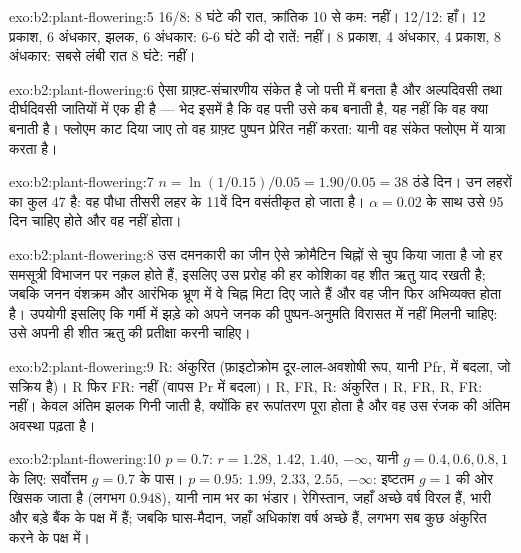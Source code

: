 \begin{solution}{exo:b2:plant-flowering:5}
16/8: 8 घंटे की रात, क्रांतिक 10 से कम: नहीं। 12/12: हाँ।
12 प्रकाश, 6 अंधकार, झलक, 6 अंधकार: 6-6 घंटे की दो रातें: नहीं।
8 प्रकाश, 4 अंधकार, 4 प्रकाश, 8 अंधकार: सबसे लंबी रात 8 घंटे: नहीं।
\end{solution}

\begin{solution}{exo:b2:plant-flowering:6}
 ऐसा ग्राफ़्ट-संचारणीय संकेत है जो पत्ती में बनता है और
अल्पदिवसी तथा दीर्घदिवसी जातियों में एक ही है --- भेद इसमें है कि
वह पत्ती उसे कब बनाती है, यह नहीं कि वह क्या बनाती है। फ्लोएम काट दिया
जाए तो वह ग्राफ़्ट पुष्पन प्रेरित नहीं करता: यानी वह संकेत
फ्लोएम में यात्रा करता है।
\end{solution}

\begin{solution}{exo:b2:plant-flowering:7}
$n = \ln(1/0.15)/0.05 = 1.90/0.05 = 38$ ठंडे दिन। उन लहरों का कुल
$47$ है: वह पौधा तीसरी लहर के 11वें दिन वसंतीकृत हो जाता है।
$\alpha = 0.02$ के साथ उसे 95 दिन चाहिए होते और वह नहीं होता।
\end{solution}

\begin{solution}{exo:b2:plant-flowering:8}
उस दमनकारी का जीन ऐसे क्रोमैटिन चिह्नों से चुप किया जाता है जो हर
समसूत्री विभाजन पर नक़ल होते हैं, इसलिए उस प्ररोह की हर कोशिका वह शीत ऋतु
याद रखती है; जबकि जनन वंशक्रम और आरंभिक भ्रूण में वे चिह्न मिटा दिए जाते
हैं और वह जीन फिर अभिव्यक्त होता है। उपयोगी इसलिए कि गर्मी में झड़े 
को अपने जनक की पुष्पन-अनुमति विरासत में नहीं मिलनी चाहिए: उसे अपनी ही
शीत ऋतु की प्रतीक्षा करनी चाहिए।
\end{solution}

\begin{solution}{exo:b2:plant-flowering:9}
R: अंकुरित (फ़ाइटोक्रोम दूर-लाल-अवशोषी रूप, यानी Pfr, में बदला, जो
सक्रिय है)। R फिर FR: नहीं (वापस Pr में बदला)।
R, FR, R: अंकुरित। R, FR, R, FR: नहीं। केवल अंतिम झलक गिनी जाती है,
क्योंकि हर रूपांतरण पूरा होता है और वह  उस रंजक की अंतिम
अवस्था पढ़ता है।
\end{solution}

\begin{solution}{exo:b2:plant-flowering:10}
$p = 0.7$: $r = 1.28$, $1.42$, $1.40$, $-\infty$, यानी $g = 0.4, 0.6, 0.8,
1$ के लिए: सर्वोत्तम $g = 0.7$ के पास। $p = 0.95$: $1.99$, $2.33$, $2.55$,
$-\infty$: इष्टतम $g = 1$ की ओर खिसक जाता है (लगभग $0.948$), यानी
नाम भर का भंडार। रेगिस्तान, जहाँ अच्छे वर्ष विरल हैं, भारी
 और बड़े  बैंक के पक्ष में हैं; जबकि घास-मैदान, जहाँ
अधिकांश वर्ष अच्छे हैं, लगभग सब कुछ अंकुरित करने के पक्ष में।
\end{solution}

